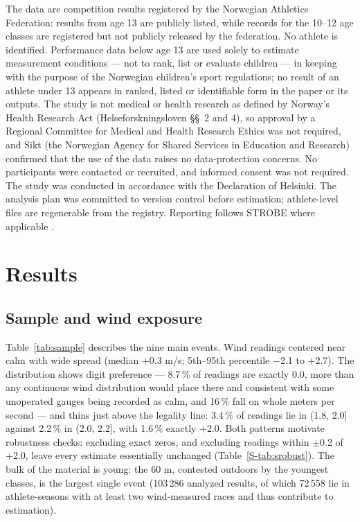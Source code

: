 \documentclass[12pt,a4paper]{article}
\begin{document}
The data are competition results registered by the Norwegian Athletics Federation: results from age 13 are publicly listed, while records for the 10--12 age classes are registered but not publicly released by the federation. No athlete is identified. Performance data below age 13 are used solely to estimate measurement conditions --- not to rank, list or evaluate children --- in keeping with the purpose of the Norwegian children's sport regulations; no result of an athlete under 13 appears in ranked, listed or identifiable form in the paper or its outputs. The study is not medical or health research as defined by Norway's Health Research Act (Helseforskningsloven \S\S~2 and 4), so approval by a Regional Committee for Medical and Health Research Ethics was not required, and Sikt (the Norwegian Agency for Shared Services in Education and Research) confirmed that the use of the data raises no data-protection concerns. No participants were contacted or recruited, and informed consent was not required. The study was conducted in accordance with the Declaration of Helsinki. The analysis plan was committed to version control before estimation; athlete-level files are regenerable from the registry. Reporting follows STROBE where applicable \citep{vonelm2007}.

\section{Results}

\subsection{Sample and wind exposure}

Table~\ref{tab:sample} describes the nine main events. Wind readings centered near calm with wide spread (median +0.3 m/s; 5th--95th percentile $-$2.1 to +2.7). The distribution shows digit preference --- 8.7\,\% of readings are exactly 0.0, more than any continuous wind distribution would place there and consistent with some unoperated gauges being recorded as calm, and 16\,\% fall on whole meters per second --- and thins just above the legality line: 3.4\,\% of readings lie in (1.8, 2.0] against 2.2\,\% in (2.0, 2.2], with 1.6\,\% exactly +2.0. Both patterns motivate robustness checks: excluding exact zeros, and excluding readings within $\pm$0.2 of +2.0, leave every estimate essentially unchanged (Table~\ref{S-tab:srobust}). The bulk of the material is young: the 60 m, contested outdoors by the youngest classes, is the largest single event (103\,286 analyzed results, of which 72\,558 lie in athlete-seasons with at least two wind-measured races and thus contribute to estimation).
\end{document}
